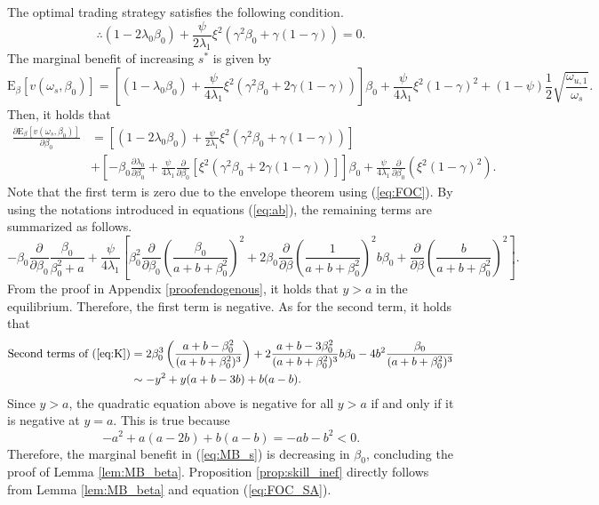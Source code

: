 The optimal trading strategy satisfies the following condition.
\begin{equation}
\therefore(1-2\lambda_{0}\beta_{0})+\frac{\psi}{2\lambda_{1}}\xi^{2}(\gamma^{2}\beta_{0}+\gamma(1-\gamma))=0.\label{eq:FOC}
\end{equation}
The marginal benefit of increasing $s^*$ is given by
\begin{equation}
\mathrm{E}_{\beta}[v(\omega_{s},\beta_{0})]=\left[(1-\lambda_{0}\beta_{0})+\frac{\psi}{4\lambda_{1}}\xi^{2}(\gamma^{2}\beta_{0}+2\gamma(1-\gamma))\right]\beta_{0}+\frac{\psi}{4\lambda_{1}}\xi^{2}(1-\gamma)^{2}+(1-\psi)\frac{1}{2}\sqrt{\frac{\omega_{u,1}}{\omega_{s}}}.\label{eq:MB_s}
\end{equation}
Then, it holds that
\begin{align*}
\frac{\partial\mathrm{E}_{\beta}[v(\omega_{s},\beta_{0})]}{\partial\beta_{0}} & =\left[(1-2\lambda_{0}\beta_{0})+\frac{\psi}{2\lambda_{1}}\xi^{2}(\gamma^{2}\beta_{0}+\gamma(1-\gamma))\right]\\
 & +\left[-\beta_{0}\frac{\partial\lambda_{0}}{\partial\beta_{0}}+\frac{\psi}{4\lambda_{1}}\frac{\partial}{\partial\beta_{0}}\left[\xi^{2}(\gamma^{2}\beta_{0}+2\gamma(1-\gamma))\right]\right]\beta_{0}+\frac{\psi}{4\lambda_{1}}\frac{\partial}{\partial\beta_{0}}\left(\xi^{2}(1-\gamma)^{2}\right).
\end{align*}
Note that the first term is zero due to the envelope theorem using (\ref{eq:FOC}). By using the notations introduced in equations (\ref{eq:ab}), the remaining terms are summarized as follows.\small{
\begin{equation}
-\beta_{0}\frac{\partial}{\partial\beta_{0}}\frac{\beta_{0}}{\beta_{0}^{2}+a}+\frac{\psi}{4\lambda_{1}}\left[\beta_{0}^{2}\frac{\partial}{\partial\beta_{0}}\left(\frac{\beta_{0}}{a+b+\beta_{0}^{2}}\right)^{2}+2\beta_{0}\frac{\partial}{\partial\beta}\left(\frac{1}{a+b+\beta_{0}^{2}}\right)^{2}b\beta_{0}+\frac{\partial}{\partial\beta}\left(\frac{b}{a+b+\beta_{0}^{2}}\right)^{2}\right].\label{eq:K}
\end{equation}}
From the proof in Appendix \ref{proofendogenous}, it holds that $y>a$ in the equilibrium. Therefore, the first term is negative. As for the second term, it holds that 
\begin{align*}
\text{Second terms of (\ref{eq:K})} & =2\beta_{0}^{3}\left(\frac{a+b-\beta_{0}^{2}}{(a+b+\beta_{0}^{2})^{3}}\right)+2\frac{a+b-3\beta_{0}^{2}}{(a+b+\beta_{0}^{2})^{3}}b\beta_{0}-4b^{2}\frac{\beta_{0}}{(a+b+\beta_{0}^{2})^{3}}\\
 & \sim-y^{2}+y(a+b-3b)+b(a-b).
\end{align*}
Since $y>a$, the quadratic equation above is negative for all $y>a$ if and only if it is negative at $y=a$. This is true because
\[
-a^{2}+a(a-2b)+b(a-b)=-ab-b^{2}<0.
\]
Therefore, the marginal benefit in (\ref{eq:MB_s}) is decreasing in $\beta_{0}$, concluding the proof of Lemma \ref{lem:MB_beta}. Proposition \ref{prop:skill_inef} directly follows from Lemma \ref{lem:MB_beta} and equation (\ref{eq:FOC_SA}).
